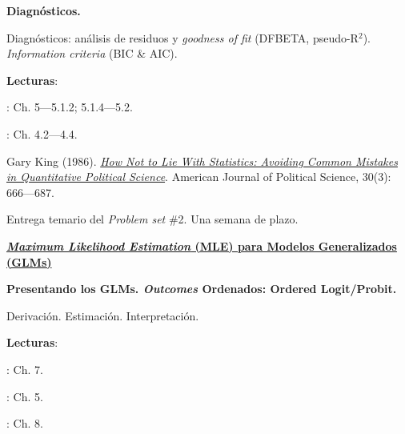 \documentclass[letterpaper]{article}
\renewenvironment{itemize}{
  \begin{list}{}{
    \setlength{\leftmargin}{1.5em}
  }
}{
  \end{list}
}
\begin{document}
\begin{enumerate}[label=\roman*.]
       \begin{itemize} 
        \item[14.] {\bf Diagn\'osticos.}
        \begin{itemize} 
          \item[$\circ$] Diagn\'osticos: an\'alisis de residuos y \emph{goodness of fit} (DFBETA, pseudo-R$^{2}$). \emph{Information criteria} (BIC \& AIC).
          \item[$\circ$] {\bf Lecturas}: 
            \begin{itemize} 
              \item[$\diamond$] \textcite{Ward2018}: Ch. 5---5.1.2; 5.1.4---5.2.
              \item[$\diamond$] \textcite{Long2001}: Ch. 4.2---4.4.
              \item[$\diamond$] Gary King (1986). \href{https://github.com/hbahamonde/MLE/raw/master/Readings/King_lie.pdf}{\emph{How Not to Lie With Statistics: Avoiding Common Mistakes in Quantitative Political Science}}. American Journal of Political Science, 30(3): 666---687.
            \end{itemize}
        \end{itemize}
      \end{itemize}
			

\item[{\color{red}\Pointinghand}] Entrega temario del \emph{Problem set} \#2. Una semana de plazo.


\item {\bf{\color{ForestGreen}\underline{\emph{Maximum Likelihood Estimation} (MLE) para Modelos Generalizados (GLMs)}}}

       \begin{itemize} 
        \item[15.] {\bf Presentando los GLMs. \emph{Outcomes} Ordenados: Ordered Logit/Probit.}
        \begin{itemize} 
          \item[$\circ$] Derivaci\'on. Estimaci\'on. Interpretaci\'on.
          \item[$\circ$] {\bf Lecturas}: 
            \begin{itemize} 
              \item[$\diamond$] \textcite{Ward2018}: Ch. 7. 
              \item[$\diamond$] \textcite{Long2001}: Ch. 5.
              \item[$\diamond$] \textcite{Ward2018}: Ch. 8. 
            \end{itemize}
        \end{itemize}
      \end{itemize}




\end{enumerate}
\end{document}
